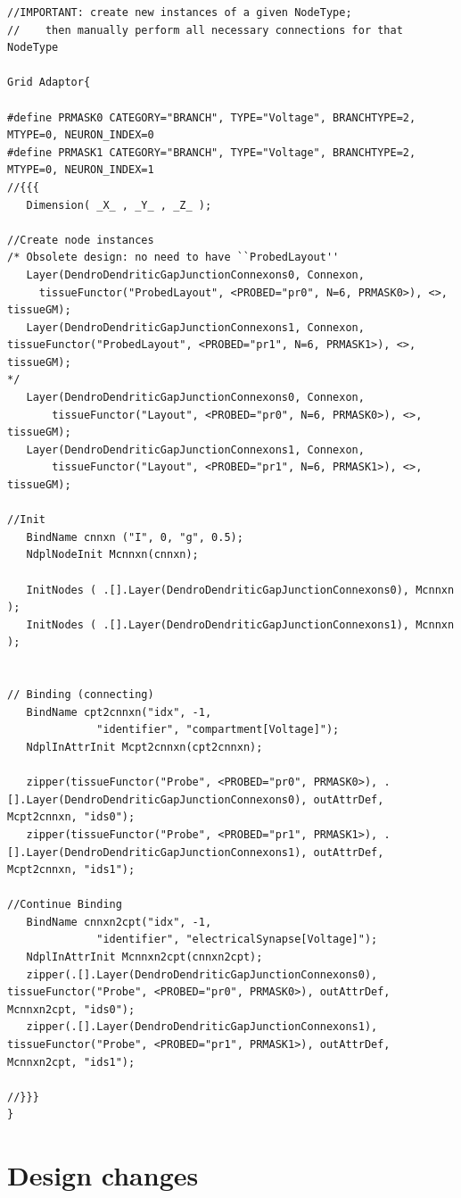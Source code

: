 {\tiny
\begin{verbatim}
//IMPORTANT: create new instances of a given NodeType; 
//    then manually perform all necessary connections for that NodeType

Grid Adaptor{

#define PRMASK0 CATEGORY="BRANCH", TYPE="Voltage", BRANCHTYPE=2, MTYPE=0, NEURON_INDEX=0
#define PRMASK1 CATEGORY="BRANCH", TYPE="Voltage", BRANCHTYPE=2, MTYPE=0, NEURON_INDEX=1
//{{{
   Dimension( _X_ , _Y_ , _Z_ );

//Create node instances
/* Obsolete design: no need to have ``ProbedLayout''
   Layer(DendroDendriticGapJunctionConnexons0, Connexon,
     tissueFunctor("ProbedLayout", <PROBED="pr0", N=6, PRMASK0>), <>, tissueGM); 
   Layer(DendroDendriticGapJunctionConnexons1, Connexon, tissueFunctor("ProbedLayout", <PROBED="pr1", N=6, PRMASK1>), <>, tissueGM);
*/   
   Layer(DendroDendriticGapJunctionConnexons0, Connexon, 
       tissueFunctor("Layout", <PROBED="pr0", N=6, PRMASK0>), <>, tissueGM);
   Layer(DendroDendriticGapJunctionConnexons1, Connexon, 
       tissueFunctor("Layout", <PROBED="pr1", N=6, PRMASK1>), <>, tissueGM);

//Init
   BindName cnnxn ("I", 0, "g", 0.5);
   NdplNodeInit Mcnnxn(cnnxn);

   InitNodes ( .[].Layer(DendroDendriticGapJunctionConnexons0), Mcnnxn );
   InitNodes ( .[].Layer(DendroDendriticGapJunctionConnexons1), Mcnnxn );


// Binding (connecting)
   BindName cpt2cnnxn("idx", -1,
   	 	      "identifier", "compartment[Voltage]");
   NdplInAttrInit Mcpt2cnnxn(cpt2cnnxn);

   zipper(tissueFunctor("Probe", <PROBED="pr0", PRMASK0>), .[].Layer(DendroDendriticGapJunctionConnexons0), outAttrDef, Mcpt2cnnxn, "ids0");
   zipper(tissueFunctor("Probe", <PROBED="pr1", PRMASK1>), .[].Layer(DendroDendriticGapJunctionConnexons1), outAttrDef, Mcpt2cnnxn, "ids1");

//Continue Binding
   BindName cnnxn2cpt("idx", -1,
   	 	      "identifier", "electricalSynapse[Voltage]");
   NdplInAttrInit Mcnnxn2cpt(cnnxn2cpt);
   zipper(.[].Layer(DendroDendriticGapJunctionConnexons0), tissueFunctor("Probe", <PROBED="pr0", PRMASK0>), outAttrDef, Mcnnxn2cpt, "ids0");
   zipper(.[].Layer(DendroDendriticGapJunctionConnexons1), tissueFunctor("Probe", <PROBED="pr1", PRMASK1>), outAttrDef, Mcnnxn2cpt, "ids1");
  
//}}}
}
\end{verbatim}
}

\section{Design changes}

